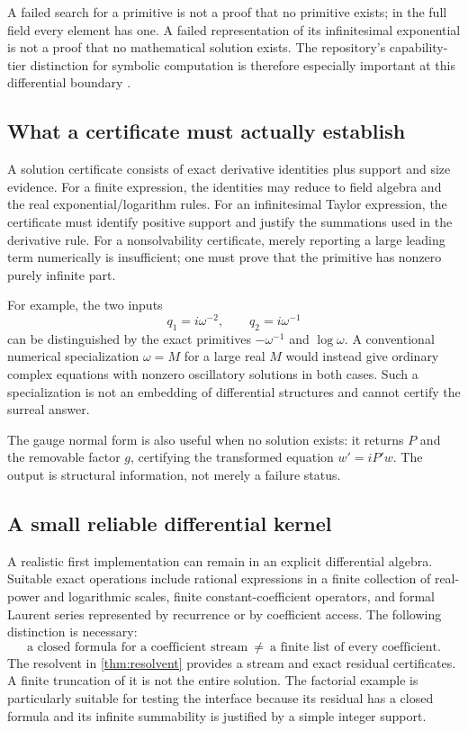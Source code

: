 \documentclass[11pt,letterpaper]{article}
\numberwithin{equation}{section}
\theoremstyle{definition}
\theoremstyle{remark}
\begin{document}
A failed search for a primitive is not a proof that no primitive exists; in the full field every element has one. A failed representation of its infinitesimal exponential is not a proof that no mathematical solution exists. The repository's capability-tier distinction for symbolic computation is therefore especially important at this differential boundary \cite{RepoCAS}.

\subsection{What a certificate must actually establish}
A solution certificate consists of exact derivative identities plus support and size evidence. For a finite expression, the identities may reduce to field algebra and the real exponential/logarithm rules. For an infinitesimal Taylor expression, the certificate must identify positive support and justify the summations used in the derivative rule. For a nonsolvability certificate, merely reporting a large leading term numerically is insufficient; one must prove that the primitive has nonzero purely infinite part.

For example, the two inputs
\[
 q_1=i\omega^{-2},\qquad q_2=i\omega^{-1}
\]
can be distinguished by the exact primitives $-\omega^{-1}$ and $\log\omega$. A conventional numerical specialization $\omega=M$ for a large real $M$ would instead give ordinary complex equations with nonzero oscillatory solutions in both cases. Such a specialization is not an embedding of differential structures and cannot certify the surreal answer.

The gauge normal form is also useful when no solution exists: it returns $P$ and the removable factor $g$, certifying the transformed equation $w'=iP'w$. The output is structural information, not merely a failure status.

\subsection{A small reliable differential kernel}
A realistic first implementation can remain in an explicit differential algebra. Suitable exact operations include rational expressions in a finite collection of real-power and logarithmic scales, finite constant-coefficient operators, and formal Laurent series represented by recurrence or by coefficient access. The following distinction is necessary:
\[
 \text{a closed formula for a coefficient stream}
 \ \ne\ 
 \text{a finite list of every coefficient}.
\]
The resolvent in \cref{thm:resolvent} provides a stream and exact residual certificates. A finite truncation of it is not the entire solution. The factorial example is particularly suitable for testing the interface because its residual has a closed formula and its infinite summability is justified by a simple integer support.
\end{document}
